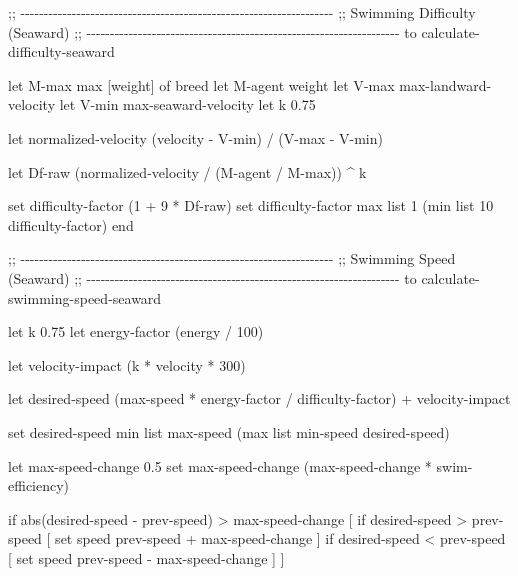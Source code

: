 \documentclass[
]{book}
\newenvironment{Shaded}{\begin{snugshade}}{\end{snugshade}}
\newcommand{\NormalTok}[1]{#1}
\begin{document}
\begin{Shaded}
\begin{Highlighting}[]
\NormalTok{;; {-}{-}{-}{-}{-}{-}{-}{-}{-}{-}{-}{-}{-}{-}{-}{-}{-}{-}{-}{-}{-}{-}{-}{-}{-}{-}{-}{-}{-}{-}{-}{-}{-}{-}{-}{-}{-}{-}{-}{-}{-}{-}{-}{-}{-}{-}{-}{-}{-}{-}{-}{-}{-}{-}{-}{-}{-}{-}{-}{-}{-}{-}{-}{-}{-}{-}{-}}
\NormalTok{;;  Swimming Difficulty (Seaward)}
\NormalTok{;; {-}{-}{-}{-}{-}{-}{-}{-}{-}{-}{-}{-}{-}{-}{-}{-}{-}{-}{-}{-}{-}{-}{-}{-}{-}{-}{-}{-}{-}{-}{-}{-}{-}{-}{-}{-}{-}{-}{-}{-}{-}{-}{-}{-}{-}{-}{-}{-}{-}{-}{-}{-}{-}{-}{-}{-}{-}{-}{-}{-}{-}{-}{-}{-}{-}{-}{-}}
\NormalTok{to calculate{-}difficulty{-}seaward}
  
\NormalTok{  let M{-}max max [weight] of breed}
\NormalTok{  let M{-}agent weight}
\NormalTok{  let V{-}max max{-}landward{-}velocity}
\NormalTok{  let V{-}min max{-}seaward{-}velocity}
\NormalTok{  let k 0.75}

\NormalTok{  let normalized{-}velocity (velocity {-} V{-}min) / (V{-}max {-} V{-}min)}

\NormalTok{  let Df{-}raw (normalized{-}velocity / (M{-}agent / M{-}max)) \^{} k}

\NormalTok{  set difficulty{-}factor (1 + 9 * Df{-}raw)}
\NormalTok{  set difficulty{-}factor max list 1 (min list 10 difficulty{-}factor)}
\NormalTok{end}


\NormalTok{;; {-}{-}{-}{-}{-}{-}{-}{-}{-}{-}{-}{-}{-}{-}{-}{-}{-}{-}{-}{-}{-}{-}{-}{-}{-}{-}{-}{-}{-}{-}{-}{-}{-}{-}{-}{-}{-}{-}{-}{-}{-}{-}{-}{-}{-}{-}{-}{-}{-}{-}{-}{-}{-}{-}{-}{-}{-}{-}{-}{-}{-}{-}{-}{-}{-}{-}{-}}
\NormalTok{;;  Swimming Speed (Seaward)}
\NormalTok{;; {-}{-}{-}{-}{-}{-}{-}{-}{-}{-}{-}{-}{-}{-}{-}{-}{-}{-}{-}{-}{-}{-}{-}{-}{-}{-}{-}{-}{-}{-}{-}{-}{-}{-}{-}{-}{-}{-}{-}{-}{-}{-}{-}{-}{-}{-}{-}{-}{-}{-}{-}{-}{-}{-}{-}{-}{-}{-}{-}{-}{-}{-}{-}{-}{-}{-}{-}}
\NormalTok{to calculate{-}swimming{-}speed{-}seaward}
  
\NormalTok{  let k 0.75}
\NormalTok{  let energy{-}factor (energy / 100)}

\NormalTok{  let velocity{-}impact (k * velocity * 300)}

\NormalTok{  let desired{-}speed }
\NormalTok{    (max{-}speed * energy{-}factor / difficulty{-}factor)}
\NormalTok{      + velocity{-}impact}

\NormalTok{  set desired{-}speed }
\NormalTok{      min list max{-}speed (max list min{-}speed desired{-}speed)}

\NormalTok{  let max{-}speed{-}change 0.5}
\NormalTok{  set max{-}speed{-}change (max{-}speed{-}change * swim{-}efficiency)}

\NormalTok{  if abs(desired{-}speed {-} prev{-}speed) \textgreater{} max{-}speed{-}change [}
\NormalTok{    if desired{-}speed \textgreater{} prev{-}speed [}
\NormalTok{      set speed prev{-}speed + max{-}speed{-}change}
\NormalTok{    ]}
\NormalTok{    if desired{-}speed \textless{} prev{-}speed [}
\NormalTok{      set speed prev{-}speed {-} max{-}speed{-}change}
\NormalTok{    ]}
\NormalTok{  ]}


\end{Highlighting}
\end{Shaded}
\end{document}

